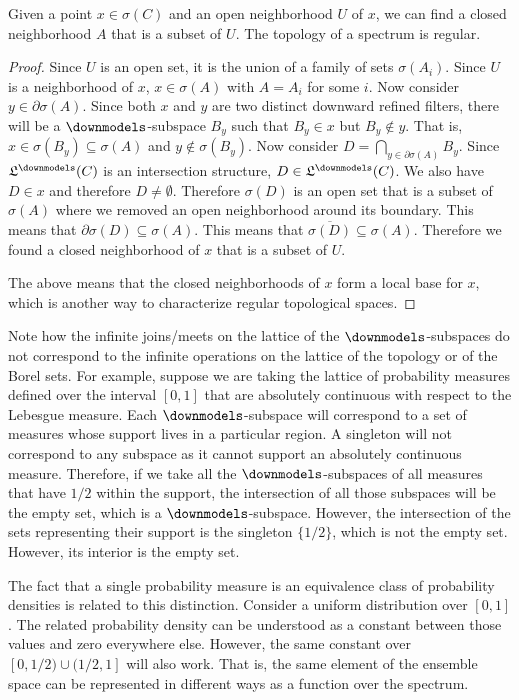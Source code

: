 \begin{conj}
	Given a point $x \in \sigma(C)$ and an open neighborhood $U$ of $x$, we can find a closed neighborhood $A$ that is a subset of $U$. The topology of a spectrum is regular.
\end{conj}

\begin{proof}
	Since $U$ is an open set, it is the union of a family of sets $\sigma(A_i)$. Since $U$ is a neighborhood of $x$, $x \in \sigma(A)$ with $A = A_i$ for some $i$. Now consider $y \in \partial \sigma(A)$. Since both $x$ and $y$ are two distinct downward refined filters, there will be a $\separate$-subspace $B_y$ such that $B_y \in x$ but $B_y \notin y$. That is, $x \in \sigma(B_y) \subseteq \sigma(A)$ and $y \notin \sigma(B_y)$. Now consider $D = \bigcap_{y \in \partial \sigma(A)} B_y$. Since $\mathfrak{L}^\separate(C)$ is an intersection structure, $D \in \mathfrak{L}^\separate(C)$. We also have $D \in x$ and therefore $D \neq \emptyset$. Therefore $\sigma(D)$ is an open set that is a subset of $\sigma(A)$ where we removed an open neighborhood around its boundary. This means that $\partial \sigma(D) \subseteq \sigma(A)$. This means that $\overline{\sigma(D)} \subseteq \sigma(A)$. Therefore we found a closed neighborhood of $x$ that is a subset of $U$.
	
	The above means that the closed neighborhoods of $x$ form a local base for $x$, which is another way to characterize regular topological spaces.
\end{proof}

\begin{mathSection}
\begin{remark}
	Note how the infinite joins/meets on the lattice of the $\separate$-subspaces do not correspond to the infinite operations on the lattice of the topology or of the Borel sets. For example, suppose we are taking the lattice of probability measures defined over the interval $[0,1]$ that are absolutely continuous with respect to the Lebesgue measure. Each $\separate$-subspace will correspond to a set of measures whose support lives in a particular region. A singleton will not correspond to any subspace as it cannot support an absolutely continuous measure. Therefore, if we take all the $\separate$-subspaces of all measures that have $1/2$ within the support, the intersection of all those subspaces will be the empty set, which is a $\separate$-subspace. However, the intersection of the sets representing their support is the singleton $\{1/2\}$, which is not the empty set. However, its interior is the empty set.
	
	The fact that a single probability measure is an equivalence class of probability densities is related to this distinction. Consider a uniform distribution over $[0,1]$. The related probability density can be understood as a constant between those values and zero everywhere else. However, the same constant over $[0,1/2) \cup (1/2,1]$ will also work. That is, the same element of the ensemble space can be represented in different ways as a function over the spectrum.
\end{remark}
\end{mathSection}

